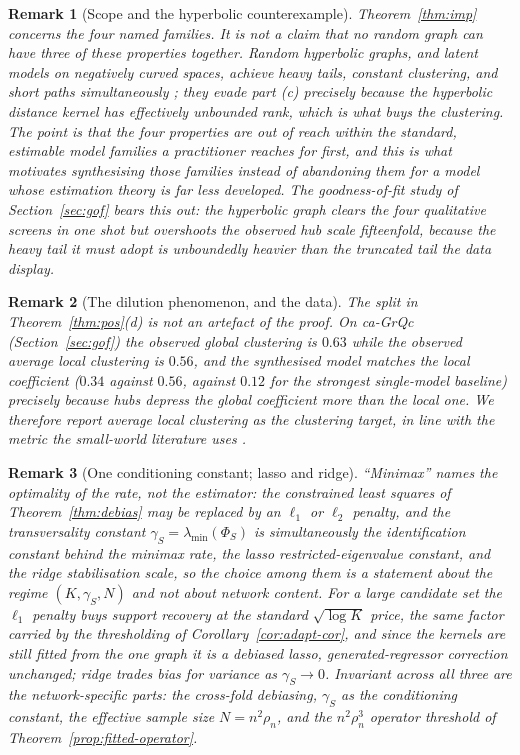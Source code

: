 \documentclass[12pt]{article}
\newtheorem{remark}{Remark}
\newcommand{\1}{\mathbf{1}}
\begin{document}
\begin{remark}[Scope and the hyperbolic counterexample]
\label{rem:imp-scope}
Theorem~\ref{thm:imp} concerns the four named families. It is not a claim that no random graph can
have three of these properties together. Random hyperbolic graphs, and latent models on negatively
curved spaces, achieve heavy tails, constant clustering, and short paths simultaneously
\citep{krioukov2010hyperbolic,gugelmann2012random,fountoulakis2021clustering}; they evade part (c) precisely because the
hyperbolic distance kernel has effectively unbounded rank, which is what buys the clustering. The
point is that the four properties are out of reach within the standard, estimable model families a
practitioner reaches for first, and this is what motivates synthesising those families instead of
abandoning them for a model whose estimation theory is far less developed. The goodness-of-fit study
of Section~\ref{sec:gof} bears this out: the hyperbolic graph clears the four qualitative screens in
one shot but overshoots the observed hub scale fifteenfold, because the heavy tail it must adopt is
unboundedly heavier than the truncated tail the data display.
\end{remark}

\begin{remark}[The dilution phenomenon, and the data]
\label{rem:dilution}
The split in Theorem~\ref{thm:pos}(d) is not an artefact of the proof. On \textsf{ca-GrQc}
(Section~\ref{sec:gof}) the observed global clustering is $0.63$ while the observed average local
clustering is $0.56$, and the synthesised model matches the local coefficient ($0.34$ against
$0.56$, against $0.12$ for the strongest single-model baseline) precisely because hubs depress the
global coefficient more than the local one. We therefore report average local clustering as the
clustering target, in line with the metric the small-world literature uses \citep{watts1998collective}.
\end{remark}

\begin{remark}[One conditioning constant; lasso and ridge]
\label{rem:lasso-ridge}
``Minimax'' names the optimality of the rate, not the estimator: the constrained least squares of
Theorem~\ref{thm:debias} may be replaced by an $\ell_1$ or $\ell_2$ penalty, and the transversality constant
$\gamma_S=\lambda_{\min}(\Phi_S)$ is simultaneously the identification constant behind the minimax rate, the
lasso restricted-eigenvalue constant, and the ridge stabilisation scale, so the choice among them is
a statement about the regime $(K,\gamma_S,N)$ and not about network content. For a large candidate set the
$\ell_1$ penalty buys support recovery at the standard $\sqrt{\log K}$ price, the same factor carried by the
thresholding of Corollary~\ref{cor:adapt-cor}, and since the kernels are still fitted from the one graph it
is a debiased lasso, generated-regressor correction unchanged; ridge trades bias for variance as
$\gamma_S\to0$. Invariant across all three are the network-specific parts: the cross-fold debiasing, $\gamma_S$
as the conditioning constant, the effective sample size $N=n^2\rho_n$, and the $n^2\rho_n^3$ operator
threshold of Theorem~\ref{prop:fitted-operator}.
\end{remark}
\end{document}
